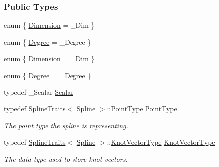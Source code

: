 \subsubsection*{Public Types}
\begin{DoxyCompactItemize}
\item 
enum \{ \hyperlink{group___splines___module_a82c233f1d4719bc52397d64a6c96c5b0a25366e5e79da5355d259a71096d8d8a7}{Dimension} = \+\_\+\+Dim
 \}
\item 
enum \{ \hyperlink{group___splines___module_a40cd07294408f87d39763e15b331b4d1a7bc38582fb1bae7db67c89b6c5f45f24}{Degree} = \+\_\+\+Degree
 \}
\item 
enum \{ \hyperlink{group___splines___module_a82c233f1d4719bc52397d64a6c96c5b0a25366e5e79da5355d259a71096d8d8a7}{Dimension} = \+\_\+\+Dim
 \}
\item 
enum \{ \hyperlink{group___splines___module_a40cd07294408f87d39763e15b331b4d1a7bc38582fb1bae7db67c89b6c5f45f24}{Degree} = \+\_\+\+Degree
 \}
\item 
typedef \+\_\+\+Scalar \hyperlink{group___splines___module_a8cafd78b564825c76fbb3419653d9742}{Scalar}
\item 
\mbox{\label{group___splines___module_a9ade8a2f81dae6eedb8845cb080672bd}} 
typedef \hyperlink{struct_eigen_1_1_spline_traits}{Spline\+Traits}$<$ \hyperlink{group___splines___module_class_eigen_1_1_spline}{Spline} $>$\+::\hyperlink{group___splines___module_a9ade8a2f81dae6eedb8845cb080672bd}{Point\+Type} \hyperlink{group___splines___module_a9ade8a2f81dae6eedb8845cb080672bd}{Point\+Type}
\begin{DoxyCompactList}\small\item\em The point type the spline is representing. \end{DoxyCompactList}\item 
\mbox{\label{group___splines___module_a066f7a8b120316c9068b559f0790e9ec}} 
typedef \hyperlink{struct_eigen_1_1_spline_traits}{Spline\+Traits}$<$ \hyperlink{group___splines___module_class_eigen_1_1_spline}{Spline} $>$\+::\hyperlink{group___splines___module_a066f7a8b120316c9068b559f0790e9ec}{Knot\+Vector\+Type} \hyperlink{group___splines___module_a066f7a8b120316c9068b559f0790e9ec}{Knot\+Vector\+Type}
\begin{DoxyCompactList}\small\item\em The data type used to store knot vectors. \end{DoxyCompactList}\item 

\end{DoxyCompactItemize}
